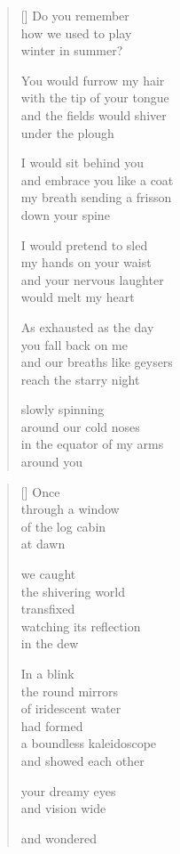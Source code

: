 \documentclass[12pt,a4paper]{article}
\begin{document}
\begin{verse}[\versewidth]
  Do you remember \\
  how we used to play \\
  winter in summer?

  You would furrow my hair \\
  with the tip of your tongue \\
  and the fields would shiver \\
  under the plough

  I would sit behind you \\
  and embrace you like a coat \\
  my breath sending a frisson \\
  down your spine

  I would pretend to sled \\
  my hands on your waist \\
  and your nervous laughter \\
  would melt my heart

  As exhausted as the day \\
  you fall back on me \\
  and our breaths like geysers \\
  reach the starry night

  slowly spinning \\
  around our cold noses \\
  in the equator of my arms \\
  around you
\end{verse}


\newpage

\poemtitle{}

\settowidth{\versewidth}{the infinite kaleidoscope}

\bigskip

\begin{verse}[\versewidth]
  Once \\
  through a window \\
  of the log cabin \\
  at dawn

  we caught \\
  the shivering world \\
  transfixed \\
  watching its reflection \\
  in the dew

  In a blink \\
  the round mirrors \\
  of iridescent water \\
  had formed \\
  a boundless kaleidoscope \\
  and showed each other

  your dreamy eyes \\
  and vision wide

  and wondered
\end{verse}
\end{document}

